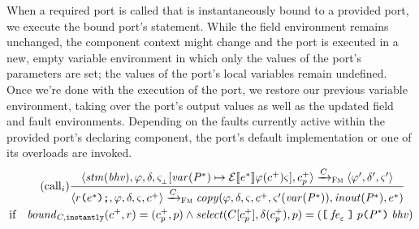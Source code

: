 \documentclass[a4paper,10pt,english]{article}
\begin{document}
When a required port is called that is instantaneously bound to a provided port, we execute the bound port's statement.
While the field environment remains unchanged, the component context might change and the port is executed in a new, empty
variable environment in which only the values of the port's parameters are set; the values of the port's local variables remain undefined. Once we're
done with the execution of the port, we restore our previous variable environment, taking over the port's output values as well
as the updated field and fault environments. Depending on the faults currently active within the provided port's
declaring component, the port's default implementation or one of its overloads are invoked.
\begin{multline*}
	\tag{call${_i}$}
	\dfrac
	{
		\configurationFm{\stmof({\behavior}), \fieldEnv, \faultEnv, \varEnvFmEmpty[\varof(\toList{\parameterDecl}) \mapsto
		\ExprSem{\toList{\expr}}\fieldEnv(\toListNE{\comp})\varEnvFm],
		\toListNE{\comp}_\provPort}
			\stmArrowFm
		\configurationFm{\fieldEnv', \faultEnv', \varEnvFm'}
	}
	{
		\configurationFm{\invokeReqPort{\reqPort}{\toList{\expr}}, \fieldEnv, \faultEnv, \varEnvFm, \toListNE{\comp}}
			\stmArrowFm
		\copyout(\fieldEnv, \faultEnv, \varEnvFm, \toListNE{\comp},
		\varEnvFm'(\varof(\toList{\parameterDecl})), \isinout(\toList{\parameterDecl}), \toList{\expr}) 
	}
	\\ \text{if} \quad \boundof_{\compDecl, \instantBindingType}(\toListNE{\comp},
	\reqPort) = (\toListNE{\comp}_\provPort, \provPort) \wedge
	\select(\compDecl[\toListNE{\comp}_\provPort], \faultEnv(\toListNE{\comp}_\provPort),
	\provPort) = (\provPortDeclSyn{\provPort}{\toList{\parameterDecl}}{\behavior}{\liftMissing{\faultExpr}})
\end{multline*}
\end{document}
